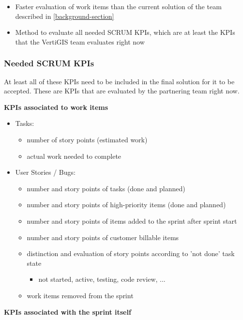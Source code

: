 \begin{itemize}
    \item Faster evaluation of work items than the current 
    solution of the team described in \ref{background-section}
    \item Method to evaluate all needed SCRUM KPIs, which are at least the KPIs that the VertiGIS team evaluates right now
\end{itemize}

\subsubsection{Needed SCRUM KPIs}

At least all of these KPIs need to be included in the final solution for it to be accepted. 
These are KPIs that are evaluated by the partnering team right now.

\textbf{KPIs associated to work items}

\begin{itemize}
    \item Tasks:
    \begin{itemize}
        \item number of story points (estimated work)
        \item actual work needed to complete
    \end{itemize}
    \item User Stories / Bugs:
    \begin{itemize}
        \item number and story points of tasks (done and planned)
        \item number and story points of high-priority items (done and planned)
        \item number and story points of items added to the sprint after sprint start
        \item number and story points of customer billable items
        \item distinction and evaluation of story points according to 'not done' task state
        \begin{itemize}
            \item not started, active, testing, code review, ...
        \end{itemize}
        \item work items removed from the sprint
    \end{itemize}
\end{itemize}

\textbf{KPIs associated with the sprint itself}


